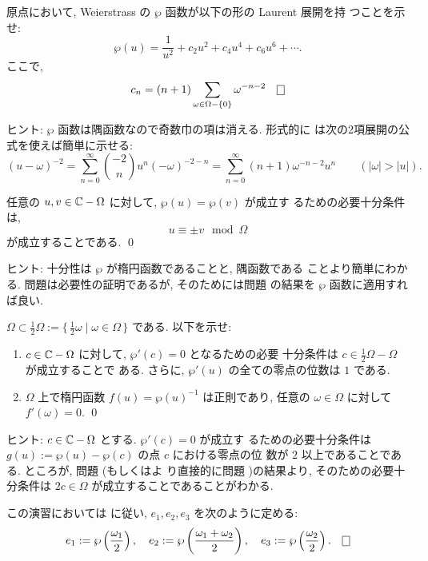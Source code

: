 \documentclass[12pt,twoside]{jarticle}
\def\setminus{-}
\def\pe{\wp}
\def\C{{\Bbb C}} %
\begin{document}
\begin{question}\label{q:pe3}\qstar{*}
  原点において, Weierstrass の $\pe$ 函数が以下の形の Laurent 展開を持
  つことを示せ:
  \[
    \pe(u) = \frac{1}{u^2} + c_2 u^2 + c_4 u^4 + c_6 u^6 + \cdots.
  \]
  ここで, 
  \[
    c_n = (n+1)\sum_{\omega\in\Omega\setminus\{0\}} \omega^{-n-2}
  \qed
  \]
\end{question}

\noindent ヒント: $\pe$ 函数は隅函数なので奇数巾の項は消える. 形式的に
は次の2項展開の公式を使えば簡単に示せる:
\[
  (u-\omega)^{-2}
  = \sum_{n=0}^\infty {-2\choose n} u^n (-\omega)^{-2-n}
  = \sum_{n=0}^\infty (n+1) \omega^{-n-2} u^n
  \qquad
  (|\omega|>|u|).
\]

\begin{question}\label{q:pe4}\qstar{*}
  任意の $u,v\in\C\setminus\Omega$ に対して, $\pe(u)=\pe(v)$ が成立す
  るための必要十分条件は,
  \[
    u \equiv \pm v \mod \Omega
  \]
  が成立することである. \qed
\end{question}

\noindent ヒント: 十分性は $\pe$ が楕円函数であることと, 隅函数である
ことより簡単にわかる. 問題は必要性の証明であるが, そのためには問題 
 の結果を $\pe$ 函数に適用すれば良い.

\begin{question}\label{q:pe5}\qstar{*}
  $\Omega\subset\frac{1}{2}\Omega := \{\,\frac{1}{2}\omega \mid
  \omega\in\Omega\,\}$ である. 以下を示せ:
  \begin{enumerate}
  \item $c\in\C\setminus\Omega$ に対して, $\pe'(c)=0$ となるための必要
    十分条件は $c\in\frac{1}{2}\Omega\setminus\Omega$ が成立することで
    ある. さらに, $\pe'(u)$ の全ての零点の位数は $1$ である.
  \item $\Omega$ 上で楕円函数 $f(u)=\pe(u)^{-1}$ は正則であり, %
    任意の $\omega\in\Omega$ に対して $f'(\omega)=0$. \qed
  \end{enumerate}
\end{question}

\noindent ヒント: $c\in\C\setminus\Omega$ とする. $\pe'(c)=0$ が成立す
るための必要十分条件は $g(u):=\pe(u)-\pe(c)$ の点 $c$ における零点の位
数が $2$ 以上であることである. ところが, 問題  (もしくはよ
り直接的に問題 )の結果より, そのための必要十分条件は %
$2c\in\Omega$ が成立することであることがわかる.

\medskip

\begin{Definition}
この演習においては \cite{HC} に従い, $e_1,e_2,e_3$ を次のように定める:
\[
  e_1 := \pe\left( \frac{\omega_1}{2} \right), \quad
  e_2 := \pe\left( \frac{\omega_1+\omega_2}{2} \right), \quad
  e_3 := \pe\left( \frac{\omega_2}{2} \right). \qed
\]
\end{Definition}
\end{document}
